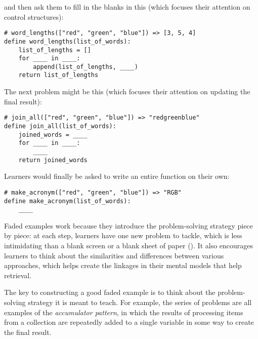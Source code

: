 \noindent
and then ask them to fill in the blanks in this (which focuses their attention on control structures):

\begin{verbatim}
# word_lengths(["red", "green", "blue"]) => [3, 5, 4]
define word_lengths(list_of_words):
    list_of_lengths = []
    for ____ in ____:
        append(list_of_lengths, ____)
    return list_of_lengths
\end{verbatim}

The next problem might be this (which focuses their attention on updating the final result):

\begin{verbatim}
# join_all(["red", "green", "blue"]) => "redgreenblue"
define join_all(list_of_words):
    joined_words = ____
    for ____ in ____:
        ____
    return joined_words
\end{verbatim}

Learners would finally be asked to write an entire function on their own:

\begin{verbatim}
# make_acronym(["red", "green", "blue"]) => "RGB"
define make_acronym(list_of_words):
    ____
\end{verbatim}

Faded examples work because
they introduce the problem-solving strategy piece by piece:
at each step,
learners have one new problem to tackle,
which is less intimidating than a blank screen or a blank sheet of paper ().
It also encourages learners to think about the similarities and differences between various approaches,
which helps create the linkages in their mental models that help retrieval.

The key to constructing a good faded example is
to think about the problem-solving strategy it is meant to teach.
For example,
the series of problems are all examples of the \emph{accumulator pattern},
in which the results of processing items from a collection
are repeatedly added to a single variable in some way to create the final result.

